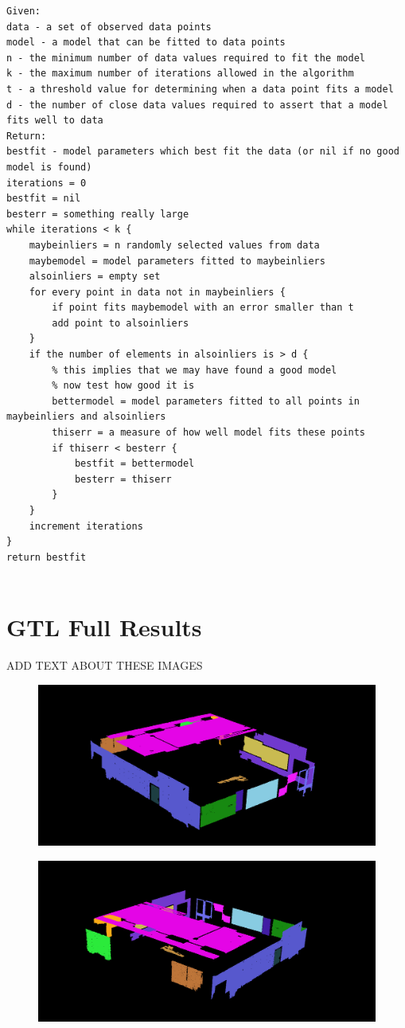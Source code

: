 \begin{lstlisting}
Given:
data - a set of observed data points
model - a model that can be fitted to data points
n - the minimum number of data values required to fit the model
k - the maximum number of iterations allowed in the algorithm
t - a threshold value for determining when a data point fits a model
d - the number of close data values required to assert that a model fits well to data
Return:
bestfit - model parameters which best fit the data (or nil if no good model is found)
iterations = 0
bestfit = nil
besterr = something really large
while iterations < k {
	maybeinliers = n randomly selected values from data
	maybemodel = model parameters fitted to maybeinliers
	alsoinliers = empty set
	for every point in data not in maybeinliers {
		if point fits maybemodel with an error smaller than t
		add point to alsoinliers
	}
	if the number of elements in alsoinliers is > d {
		% this implies that we may have found a good model
		% now test how good it is
		bettermodel = model parameters fitted to all points in maybeinliers and alsoinliers
		thiserr = a measure of how well model fits these points
		if thiserr < besterr {
			bestfit = bettermodel
			besterr = thiserr
		}
	}
	increment iterations
}
return bestfit


\end{lstlisting}


\chapter{GTL Full Results}

ADD TEXT ABOUT THESE IMAGES

\begin{figure}[H]
\centering
\includegraphics[width=1\linewidth]{Includes/images/Appendix/GTL-Full-seg}
\caption{}
\label{fig:GTL-Full-seg}
\end{figure}

\begin{figure}[H]
	\centering
	\includegraphics[width=1\linewidth]{Includes/images/Appendix/GTL-Full-seg2}
	\caption{}
	\label{fig:GTL-Full-seg2}
\end{figure}


